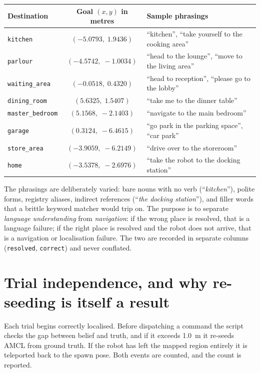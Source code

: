 \documentclass[11pt,a4paper]{report}
\newcommand{\file}[1]{\texttt{\small #1}}
\begin{document}
\begin{center}
\small
\begin{tabular}{@{}lcp{8.4cm}@{}}
\toprule
\textbf{Destination} & \textbf{Goal $(x,y)$ in metres} & \textbf{Sample phrasings} \\
\midrule
\file{kitchen}        & $(-5.0793,\; 1.9436)$ & ``kitchen'', ``take yourself to the cooking area'' \\
\file{parlour}        & $(-4.5742,\; -1.0034)$& ``head to the lounge'', ``move to the living area'' \\
\file{waiting\_area}  & $(-0.0518,\; 0.4320)$ & ``head to reception'', ``please go to the lobby'' \\
\file{dining\_room}   & $(5.6325,\; 1.5407)$  & ``take me to the dinner table'' \\
\file{master\_bedroom}& $(5.1568,\; -2.1403)$ & ``navigate to the main bedroom'' \\
\file{garage}         & $(0.3124,\; -6.4615)$ & ``go park in the parking space'', ``car park'' \\
\file{store\_area}    & $(-3.9059,\; -6.2149)$& ``drive over to the storeroom'' \\
\file{home}           & $(-3.5378,\; -2.6976)$& ``take the robot to the docking station'' \\
\bottomrule
\end{tabular}
\end{center}

The phrasings are deliberately varied: bare nouns with no verb
(``\emph{kitchen}''), polite forms, registry aliases, indirect references
(``\emph{the docking station}''), and filler words that a brittle keyword
matcher would trip on. The purpose is to separate \emph{language
understanding} from \emph{navigation}: if the wrong place is resolved, that is
a language failure; if the right place is resolved and the robot does not
arrive, that is a navigation or localisation failure. The two are recorded in
separate columns (\file{resolved}, \file{correct}) and never conflated.

\section{Trial independence, and why re-seeding is itself a result}

Each trial begins correctly localised. Before dispatching a command the script
checks the gap between belief and truth, and if it exceeds \SI{1.0}{\metre} it
re-seeds AMCL from ground truth. If the robot has left the mapped region
entirely it is teleported back to the spawn pose. Both events are counted, and
the count is reported.
\end{document}
